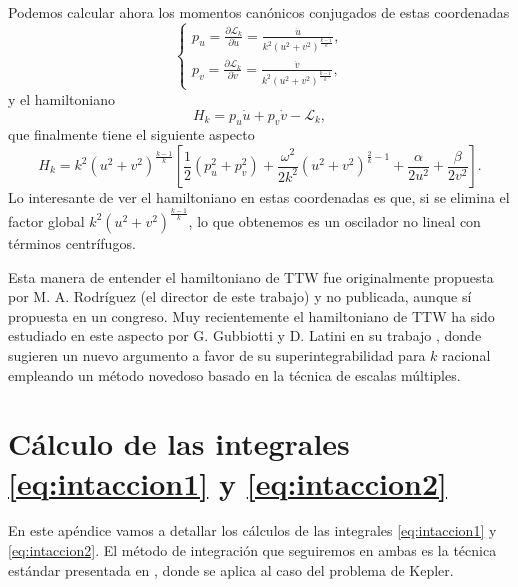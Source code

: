 \documentclass[12pt,a4paper,twoside]{article}
\theoremstyle{definition} \newtheorem{defn}[thm]{Definición}
\theoremstyle{definition} \newtheorem{ejemplo}[thm]{Ejemplo}
\theoremstyle{definition} \newtheorem{ejercicio}[thm]{Ejercicio}
\theoremstyle{remark} \newtheorem*{obs}{Observación}
\begin{document}
Podemos calcular ahora los momentos canónicos conjugados de estas coordenadas
\begin{equation}
  \begin{cases}
    p_u=\frac{\partial \mathcal{L} _k}{\partial \dot{u}}=\frac{\dot{u}}{k^2 (u^2+v^2)^{\frac{k-1}{k}}}, \\
    p_v=\frac{\partial \mathcal{L} _k}{\partial \dot{v}}=\frac{\dot{v}}{k^2 (u^2+v^2)^{\frac{k-1}{k}}},
  \end{cases}
\end{equation}
y el hamiltoniano
\begin{equation*}
  H_k=p_u \dot{u} + p_v \dot{v} - \mathcal{L}_k,
\end{equation*}
que finalmente tiene el siguiente aspecto
\begin{equation}
  H_k = k^2 (u^2+v^2)^{\frac{k-1}{k}}\left[ \frac{1}{2}(p_u^2+p_v^2)+ \frac{\omega^2}{2k^2}(u^2+v^2)^{\frac{2}{k}-1}+\frac{\alpha}{2u^2}+\frac{\beta}{2 v^2} \right]. 
\end{equation}
Lo interesante de ver el hamiltoniano en estas coordenadas es que, si se elimina el factor global $k^2(u^2+v^2)^{\frac{k-1}{k}}$, lo que obtenemos es un oscilador no lineal con términos centrífugos.

Esta manera de entender el hamiltoniano de TTW fue originalmente propuesta por M. A. Rodríguez (el director de este trabajo) y no publicada, aunque sí propuesta en un congreso. Muy recientemente el hamiltoniano de TTW ha sido estudiado en este aspecto por G. Gubbiotti y D. Latini en su trabajo \cite{gubbiottilatini}, donde sugieren un nuevo argumento a favor de su superintegrabilidad para $k$ racional empleando un método novedoso basado en la técnica de escalas múltiples.

\appendix
\section{Cálculo de las integrales \eqref{eq:intaccion1} y \eqref{eq:intaccion2}}
En este apéndice vamos a detallar los cálculos de las integrales \eqref{eq:intaccion1} y \eqref{eq:intaccion2}. El método de integración que seguiremos en ambas es la técnica estándar presentada en \cite{goldstein}, donde se aplica al caso del problema de Kepler.
\end{document}

